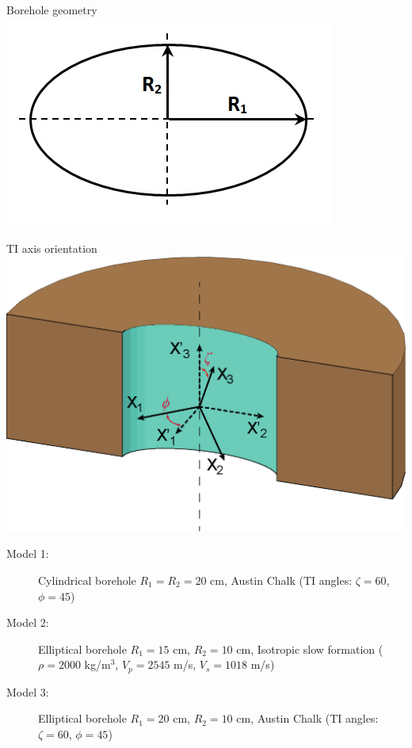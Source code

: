 \documentclass[a4paper,11pt]{article}
\begin{document}
\begin{minipage}[c]{0.47\linewidth}	
\begin{center}
		Borehole geometry \\
		\includegraphics[width=1\linewidth]{./images/nonorth_alford/scheme_bh_image_hr.jpg}	  
\end{center}	  		
\end{minipage} \hfill
\begin{minipage}[c]{0.47\linewidth}
\begin{center}
		TI axis orientation\\
			\includegraphics[width=1\linewidth]{./images/nonorth_alford/TI_axes_desc.eps}		
\end{center}
\end{minipage}

\begin{description}
\item[Model 1:] Cylindrical borehole  $R_1=R_2=20$ cm, Austin Chalk (TI angles: $\zeta=60$\textdegree, $\phi=45$\textdegree)
\item[Model 2:] Elliptical borehole $R_1=15$ cm, $R_2=10$ cm, Isotropic slow formation ($\rho=2000$ kg/m$^3$, $V_p=2545$ m/s, $V_s=1018$ m/s) 
\item[Model 3:] Elliptical borehole $R_1=20$ cm, $R_2=10$ cm, Austin Chalk (TI angles: $\zeta=60$\textdegree, $\phi=45$\textdegree) 
\end{description}
\end{document}

